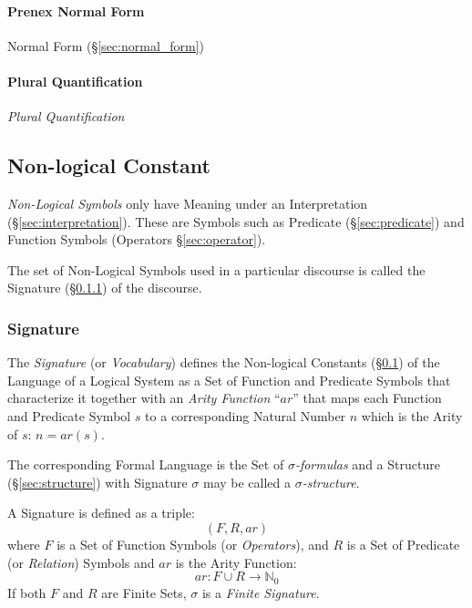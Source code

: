 \paragraph{Prenex Normal Form}\label{sec:prenex_normal}\hfill

Normal Form (\S\ref{sec:normal_form})



\paragraph{Plural Quantification}\label{sec:plural_quantification}
\hfill

\emph{Plural Quantification}



\subsection{Non-logical Constant}\label{sec:nonlogical_constant}

\emph{Non-Logical Symbols} only have Meaning under an Interpretation
(\S\ref{sec:interpretation}). These are Symbols such as Predicate
(\S\ref{sec:predicate}) and Function Symbols (Operators
\S\ref{sec:operator}).

The set of Non-Logical Symbols used in a particular discourse is
called the Signature (\S\ref{sec:signature}) of the discourse.



\subsubsection{Signature}\label{sec:signature}

The \emph{Signature} (or \emph{Vocabulary}) defines the Non-logical
Constants (\S\ref{sec:nonlogical_constant}) of the Language of a
Logical System as a Set of Function and Predicate Symbols that
characterize it together with an \emph{Arity Function} ``$ar$'' that
maps each Function and Predicate Symbol $s$ to a corresponding Natural
Number $n$ which is the Arity of $s$: $n = ar(s)$.

The corresponding Formal Language is the Set of
\emph{$\sigma$-formulas} and a Structure (\S\ref{sec:structure}) with
Signature $\sigma$ may be called a \emph{$\sigma$-structure}.

A Signature is defined as a triple:
\[
  (F,R,ar)
\]
where $F$ is a Set of Function Symbols (or \emph{Operators}), and $R$
is a Set of Predicate (or \emph{Relation}) Symbols and $ar$ is the
Arity Function:
\[
  ar: F \cup R \rightarrow \mathbb{N}_0
\]
If both $F$ and $R$ are Finite Sets, $\sigma$ is a \emph{Finite
  Signature}.

